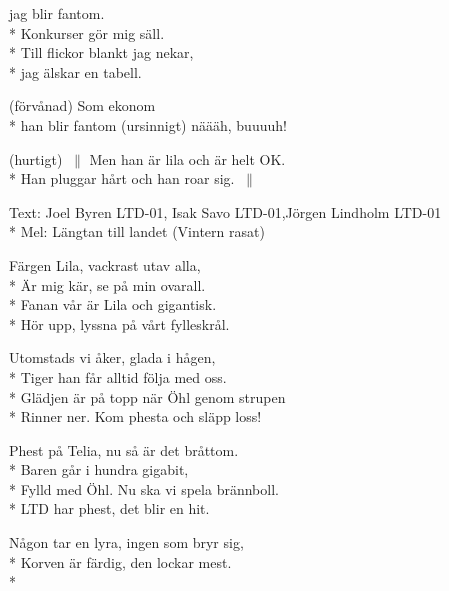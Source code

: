 \begin{SongText}
\begin{Verse}
jag blir fantom.\\*%
Konkurser gör mig säll.\\*%
Till flickor blankt jag nekar,\\*%
jag älskar en tabell.
\end{Verse}
\begin{Verse}
(förvånad) Som ekonom\\*%
han blir fantom (ursinnigt) näääh, buuuuh!
\end{Verse}
\begin{Verse}
(hurtigt) $\:\|$ Men han är lila och är helt OK.\\*%
Han pluggar hårt och han roar sig. $\:\|$
\end{Verse}
\end{SongText}

\begin{SongText}
    \begin{SongInfo}
        Text: Joel Byren LTD-01, Isak Savo LTD-01,Jörgen Lindholm LTD-01\\*%
        Mel: Längtan till landet (Vintern rasat)
    \end{SongInfo}
    \begin{Verse}
        Färgen Lila, vackrast utav alla,\\*%
        Är mig kär, se på min ovarall.\\*%
        Fanan vår är Lila och gigantisk.\\*%
        Hör upp, lyssna på vårt fylleskrål.
    \end{Verse}
    \begin{Verse}
        Utomstads vi åker, glada i hågen,\\*%
        Tiger han får alltid följa med oss.\\*%
        Glädjen är på topp när Öhl genom strupen\\*%
        Rinner ner. Kom phesta och släpp loss!
    \end{Verse}
    \begin{Verse}
        Phest på Telia, nu så är det bråttom.\\*%
        Baren går i hundra gigabit,\\*%
        Fylld med Öhl. Nu ska vi spela brännboll.\\*%
        LTD har phest, det blir en hit.
    \end{Verse}
    \begin{Verse}
        Någon tar en lyra, ingen som bryr sig,\\*%
        Korven är färdig, den lockar mest.\\*%

\end{Verse}
\end{SongText}
